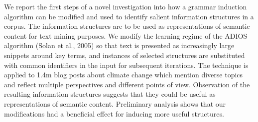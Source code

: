 We report the first steps of a novel investigation into how a grammar induction algorithm can be modified and used to identify salient information structures in a corpus. The information structures are to be used as representations of semantic content for text mining purposes.  We modify the learning regime of the ADIOS algorithm (Solan et al., 2005) so that text is presented as increasingly large snippets around key terms, and instances of selected structures are substituted with common identifiers in the input for subsequent iterations. The technique is applied to 1.4m blog posts about climate change which mention diverse topics and reflect multiple perspectives and different points of view. Observation of the resulting information structures suggests that they could be useful as representations of semantic content. Preliminary analysis shows that our modifications had a beneficial effect for inducing more useful structures.
